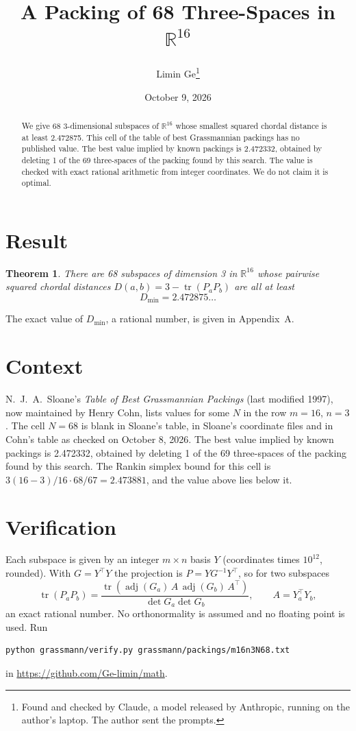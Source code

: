 \documentclass[11pt,a4paper]{article}
\title{A Packing of 68 Three-Spaces in $\mathbb{R}^{16}$}
\author{Limin Ge\thanks{Found and checked by Claude, a model released by Anthropic, running on the author's laptop. The author sent the prompts.}}
\date{October 9, 2026}
\newtheorem*{theorem}{Theorem}
\begin{document}
\maketitle
\begin{abstract}
We give 68 3-dimensional subspaces of $\mathbb{R}^{16}$ whose smallest squared chordal distance is at least 2.472875. This cell of the table of best Grassmannian packings has no published value. The best value implied by known packings is 2.472332, obtained by deleting 1 of the 69 three-spaces of the packing found by this search. The value is checked with exact rational arithmetic from integer coordinates. We do not claim it is optimal.
\end{abstract}

\section{Result}
\begin{theorem}
There are 68 subspaces of dimension 3 in $\mathbb{R}^{16}$ whose pairwise squared chordal distances $D(a,b) = 3 - \operatorname{tr}(P_aP_b)$ are all at least
\[ D_{\min} = 2.472875\ldots \]
\end{theorem}
The exact value of $D_{\min}$, a rational number, is given in Appendix~A.


\section{Context}
N.~J.~A.~Sloane's \emph{Table of Best Grassmannian Packings} (last modified 1997), now maintained by Henry Cohn, lists values for some $N$ in the row $m=16$, $n=3$. The cell $N=68$ is blank in Sloane's table, in Sloane's coordinate files and in Cohn's table as checked on October 8, 2026. The best value implied by known packings is 2.472332, obtained by deleting 1 of the 69 three-spaces of the packing found by this search. The Rankin simplex bound for this cell is $3(16-3)/16\cdot 68/67 = 2.473881$, and the value above lies below it.


\section{Verification}
Each subspace is given by an integer $m\times n$ basis $Y$ (coordinates times $10^{12}$, rounded). With $G=Y^\top Y$ the projection is $P=YG^{-1}Y^\top$, so for two subspaces
\[ \operatorname{tr}(P_aP_b)=\frac{\operatorname{tr}(\operatorname{adj}(G_a)\,A\,\operatorname{adj}(G_b)\,A^\top)}{\det G_a\det G_b},\qquad A=Y_a^\top Y_b, \]
an exact rational number. No orthonormality is assumed and no floating point is used. Run
\begin{verbatim}
python grassmann/verify.py grassmann/packings/m16n3N68.txt
\end{verbatim}
in \url{https://github.com/Ge-limin/math}.
\end{document}
